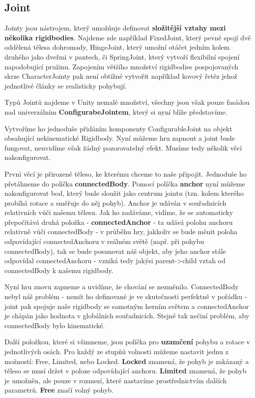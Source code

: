 \subsection{Joint}

Jointy jsou nástrojem, který umožňuje definovat \textbf{složitější vztahy mezi několika rigidbodies}. Najdeme zde například FixedJoint, který pevně spojí dvě oddělená tělesa dohromady, HingeJoint, který umožní otáčet jedním kolem druhého jako dveřmi v pantech, či SpringJoint, který vytvoří flexibilní spojení napodobující pružinu. Zapojením většího množství rigidbodies pospojovaných skrze CharacterJointy pak není obtížné vytvořit například kovový řetěz jehož jednotlivé články se realisticky pohybují.

Typů Jointů najdeme v Unity nemalé množství, všechny jsou však pouze fasádou nad univerzálním \textbf{ConfigurabeJointem}, který si nyní blíže představíme.

Vytvoříme ho jednoduše přidáním komponenty ConfigurableJoint na objekt obsahující nekinematické Rigidbody. Nyní můžeme hru zapnout a joint bude fungovat, neuvidíme však žádný pozorovatelný efekt. Musíme tedy několik věcí nakonfigurovat.

První věcí je přirozeně těleso, ke kterému chceme to naše připojit. Jednoduše ho přetáhneme do políčka \textbf{connectedBody}. Pomocí políčka \textbf{anchor} nyní můžeme nakonfigurovat bod, který bude sloužit jako centrum jointu (tzn. kolem kterého probíhá rotace a směřuje do něj pohyb). Anchor je udáván v souřadnicích relativních vůči našemu tělesu. Jak ho zadáváme, vidíme, že se automaticky přepočítává druhá položka - \textbf{connectedAnchor} - ta udává polohu anchoru relativně vůči connectedBody - v průběhu hry, jakkoliv se bude měnit poloha odpovídající connectedAnchoru v reálném světě (např. při pohybu connectedBody), tak se bude posunovat náš objekt, aby jeho anchor stále odpovídal connectedAnchoru - vzniká tedy jakýsi parent->child vztah od connectedBody k našemu rigidbody. 

Nyní hru znovu zapneme a uvidíme, že chování se nezměnilo. ConnectedBody nebyl náš problém - nemít ho definované je ve skutečnosti perfektně v pořádku - joint pak spojuje naše rigidbody se samotným herním světem a connectedAnchor je chápán jako hodnota v globálních souřadnicích. Stejně tak nečiní problém, aby connectedBody bylo kinematické.

Další položkou, které si všimneme, jsou políčka pro \textbf{uzamčení} pohybu a rotace v jednotlivých osách. Pro každý ze stupňů volnosti můžeme nastavit jednu z možností: Free, Limited, nebo Locked. \textbf{Locked} znamená, že pohyb je zakázaný a těleso se musí držet v poloze odpovídající anchoru. \textbf{Limited} znamená, že pohyb je umožněn, ale pouze v rozmezí, které nastavíme prostřednictvím dalších parametrů. \textbf{Free} značí volný pohyb.

